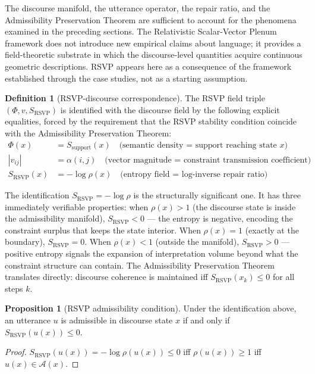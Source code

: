 \documentclass[11pt, a4paper]{article}
\theoremstyle{definition}
\newtheorem{definition}{Definition}
\newtheorem{proposition}{Proposition}
\theoremstyle{remark}
\begin{document}
The discourse manifold, the utterance operator, the repair ratio, and the
Admissibility Preservation Theorem are sufficient to account for the phenomena
examined in the preceding sections. The Relativistic Scalar-Vector Plenum
framework does not introduce new empirical claims about language; it provides
a field-theoretic substrate in which the discourse-level quantities acquire
continuous geometric descriptions. RSVP appears here as a consequence of the
framework established through the case studies, not as a starting assumption.

\begin{definition}[RSVP-discourse correspondence]
The RSVP field triple $(\Phi, v, S_{\mathrm{RSVP}})$ is identified with the
discourse field by the following explicit equalities, forced by the requirement
that the RSVP stability condition coincide with the Admissibility Preservation
Theorem:
\begin{align}
\Phi(x) &= S_{\mathrm{support}}(x)
  \quad \text{(semantic density = support reaching state } x\text{)} \\
|v_{ij}| &= \alpha(i,j)
  \quad \text{(vector magnitude = constraint transmission coefficient)} \\
S_{\mathrm{RSVP}}(x) &= -\log \rho(x)
  \quad \text{(entropy field = log-inverse repair ratio)}
\end{align}
\end{definition}

The identification $S_{\mathrm{RSVP}} = -\log\rho$ is the structurally
significant one. It has three immediately verifiable properties: when
$\rho(x) > 1$ (the discourse state is inside the admissibility manifold),
$S_{\mathrm{RSVP}} < 0$ --- the entropy is negative, encoding the constraint
surplus that keeps the state interior. When $\rho(x) = 1$ (exactly at the
boundary), $S_{\mathrm{RSVP}} = 0$. When $\rho(x) < 1$ (outside the
manifold), $S_{\mathrm{RSVP}} > 0$ --- positive entropy signals the expansion
of interpretation volume beyond what the constraint structure can contain.
The Admissibility Preservation Theorem translates directly: discourse coherence
is maintained iff $S_{\mathrm{RSVP}}(x_k) \leq 0$ for all steps $k$.

\begin{proposition}[RSVP admissibility condition]
Under the identification above, an utterance $u$ is admissible in discourse
state $x$ if and only if $S_{\mathrm{RSVP}}(u(x)) \leq 0$.
\end{proposition}

\begin{proof}
$S_{\mathrm{RSVP}}(u(x)) = -\log\rho(u(x)) \leq 0$ iff $\rho(u(x)) \geq 1$
iff $u(x) \in \mathcal{A}(x)$.
\end{proof}
\end{document}
